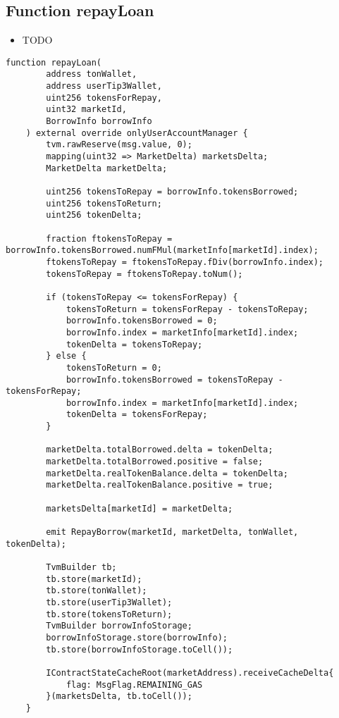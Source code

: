 \subsection{Function repayLoan}

\noindent\begin{itemize}
\item TODO
\end{itemize}

\begin{lstlisting}[firstnumber=109]
    function repayLoan(
        address tonWallet,
        address userTip3Wallet,
        uint256 tokensForRepay,
        uint32 marketId,
        BorrowInfo borrowInfo
    ) external override onlyUserAccountManager {
        tvm.rawReserve(msg.value, 0);
        mapping(uint32 => MarketDelta) marketsDelta;
        MarketDelta marketDelta;

        uint256 tokensToRepay = borrowInfo.tokensBorrowed;
        uint256 tokensToReturn;
        uint256 tokenDelta;

        fraction ftokensToRepay = borrowInfo.tokensBorrowed.numFMul(marketInfo[marketId].index);
        ftokensToRepay = ftokensToRepay.fDiv(borrowInfo.index);
        tokensToRepay = ftokensToRepay.toNum();

        if (tokensToRepay <= tokensForRepay) {
            tokensToReturn = tokensForRepay - tokensToRepay;
            borrowInfo.tokensBorrowed = 0;
            borrowInfo.index = marketInfo[marketId].index;
            tokenDelta = tokensToRepay;
        } else {
            tokensToReturn = 0;
            borrowInfo.tokensBorrowed = tokensToRepay - tokensForRepay;
            borrowInfo.index = marketInfo[marketId].index;
            tokenDelta = tokensForRepay;
        }

        marketDelta.totalBorrowed.delta = tokenDelta;
        marketDelta.totalBorrowed.positive = false;
        marketDelta.realTokenBalance.delta = tokenDelta;
        marketDelta.realTokenBalance.positive = true;

        marketsDelta[marketId] = marketDelta;

        emit RepayBorrow(marketId, marketDelta, tonWallet, tokenDelta);

        TvmBuilder tb;
        tb.store(marketId);
        tb.store(tonWallet);
        tb.store(userTip3Wallet);
        tb.store(tokensToReturn);
        TvmBuilder borrowInfoStorage;
        borrowInfoStorage.store(borrowInfo);
        tb.store(borrowInfoStorage.toCell());

        IContractStateCacheRoot(marketAddress).receiveCacheDelta{
            flag: MsgFlag.REMAINING_GAS
        }(marketsDelta, tb.toCell());
    }
\end{lstlisting}

